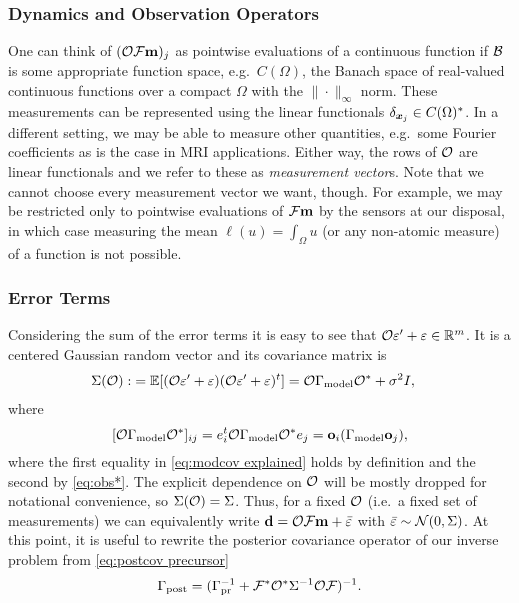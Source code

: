 \documentclass{amsart}
\numberwithin{equation}{section}
\begin{document}
\subsubsection{Dynamics and Observation Operators}\label{subsec:dynamics}
One can think of $(\mathcal{O} \mathcal{F} \mathbf{m})_j$ as pointwise evaluations of a
continuous function if $\mathcal{B}$ is some appropriate function space,
e.g.\ $C(\Omega)$, the Banach space of real-valued continuous
functions over a compact $\Omega$ with the $\| \cdot \|_{\infty}$
norm. These measurements can be represented using the linear
functionals $\delta_{{\boldsymbol{x}}_j} \in C(\Omega)^*$. In a different setting,
we may be able to measure other quantities, e.g.\ some Fourier
coefficients as is the case in MRI applications. Either way, the rows
of $\mathcal{O}$ are linear functionals and we refer to these as {\it
  measurement vector}s. Note that we cannot choose every measurement
vector we want, though. For example, we may be restricted only to
pointwise evaluations of $\mathcal{F} \mathbf{m}$ by the sensors at our disposal,
in which case measuring the mean $\ell(u) = \int_{\Omega}u$ (or any
non-atomic measure) of a function is not possible.

\subsubsection{Error Terms}
Considering the sum of the error terms it is easy to see that $\mathcal{O}
\varepsilon' + \varepsilon \in \mathbb{R}^m$. It is a centered Gaussian random vector and
its covariance matrix is
\begin{align}\label{eq:Sigma}
  \begin{split}
    \Sigma(\mathcal{O}) :&= \mathbb{E}[ (\mathcal{O} \varepsilon' + \varepsilon)  (\mathcal{O} \varepsilon' + \varepsilon)^t ] 
    = \mathcal{O} \Gamma_{\textup{model}} \mathcal{O}^* + \sigma^2I , 
  \end{split}
\end{align}
where
\begin{equation}\label{eq:modcov explained}
  [\mathcal{O} \Gamma_{\textup{model}} \mathcal{O}^*]_{ij} = e_i^t \mathcal{O} \Gamma_{\textup{model}} \mathcal{O}^* e_j = \mathbf{o}_i (\Gamma_{\textup{model}} \mathbf{o}_j),
\end{equation}
where the first equality in \eqref{eq:modcov explained} holds by
definition and the second by \eqref{eq:obs*}. The explicit dependence
on $\mathcal{O}$ will be mostly dropped for notational convenience, so
$\Sigma(\mathcal{O}) = \Sigma$. Thus, for a fixed $\mathcal{O}$ (i.e.\ a fixed set
of measurements) we can equivalently write $\mathbf{d} = \mathcal{O} \mathcal{F} \mathbf{m} +
\bar{\varepsilon}$ with $\bar{\varepsilon} \sim \mathcal{N}(0,\Sigma)$. At this point,
it is useful to rewrite the posterior covariance operator of our
inverse problem from \eqref{eq:postcov precursor}
\begin{align}\label{eq:postcov}
  \Gamma_{\textup{post}} = (\Gamma_{\textup{pr}}^{-1} + \mathcal{F}^* \mathcal{O}^* \Sigma^{-1} \mathcal{O} \mathcal{F}
  )^{-1}.
\end{align}
\end{document}
